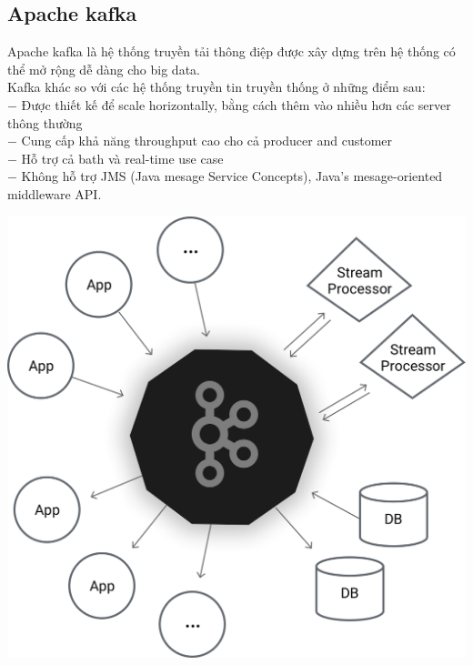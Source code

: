 \documentclass{hcmutarticle}
\begin{document}
\subsection{Apache kafka}

Apache kafka là hệ thống truyền tải thông điệp được xây dựng
trên hệ thống có thể mở rộng dễ dàng cho big data. \\
Kafka khác so với các hệ thống truyền tin truyền thống ở những
điểm sau: \\
$-$ Được thiết kế để scale horizontally, bằng cách thêm vào
nhiều hơn các server thông thường\\
$-$ Cung cấp khả năng throughput cao cho cả producer and
customer\\
$-$ Hỗ trợ cả bath và real-time use case\\
$-$ Không hỗ trợ JMS (Java mesage Service Concepts), Java's
mesage-oriented middleware API.

\begin{center}
\includegraphics[scale=0.2]{image/kafka_diagram.png}\\[1cm]
\end{center}
\end{document}
